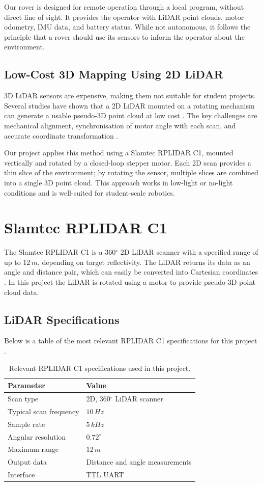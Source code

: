 Our rover is designed for remote operation through a local program, without direct line of sight. 
It provides the operator with LiDAR point clouds, motor odometry, IMU data, and battery status. While not autonomous, 
it follows the principle that a rover should use its sensors to inform the operator about the environment.

\subsection{Low-Cost 3D Mapping Using 2D LiDAR}
3D LiDAR sensors are expensive, making them not suitable for student projects. 
Several studies have shown that a 2D LiDAR mounted on a rotating mechanism can generate a usable pseudo-3D point cloud at low cost \cite{LowCostLiDAR}.
The key challenges are mechanical alignment, synchronisation of motor angle with each scan, and accurate coordinate transformation \cite{LowCostLiDAR}.

Our project applies this method using a Slamtec RPLIDAR C1, mounted vertically and rotated by a closed-loop stepper motor. 
Each 2D scan provides a thin slice of the environment; by rotating the sensor, multiple slices are combined into a single 3D point cloud. 
This approach works in low-light or no-light conditions and is well-suited for student-scale robotics.

\section{Slamtec RPLIDAR C1}
The Slamtec RPLIDAR C1 is a 360\(^\circ\) 2D LiDAR scanner with a specified range of up to \(12\,m\), depending on target reflectivity. The LiDAR returns its data as an angle and distance pair, which can easily be converted into Cartesian coordinates \cite{RPLIDARDatasheet}.
In this project the LiDAR is rotated using a motor to provide pseudo-3D point cloud data.
\subsection{LiDAR Specifications}
Below is a table of the most relevant RPLIDAR C1 specifications for this project \cite{RPLIDARDatasheet}.
\begin{table}[H]
    \centering
    \caption{Relevant RPLIDAR C1 specifications used in this project.}
    \label{tab:rplidar_c1_specs}
    \begin{tabularx}{0.85\textwidth}{l X}
        \hline
        \textbf{Parameter} & \textbf{Value} \\
        \hline
        Scan type & 2D, 360\(^\circ\) LiDAR scanner \\
        Typical scan frequency & \(10\,Hz\) \\
        Sample rate & \(5\,kHz\) \\
        Angular resolution & \(0.72^\circ\) \\
        Maximum range & \(12\,m\) \\
        Output data & Distance and angle measurements \\
        Interface & TTL UART \\
        \hline
    \end{tabularx}
\end{table}

